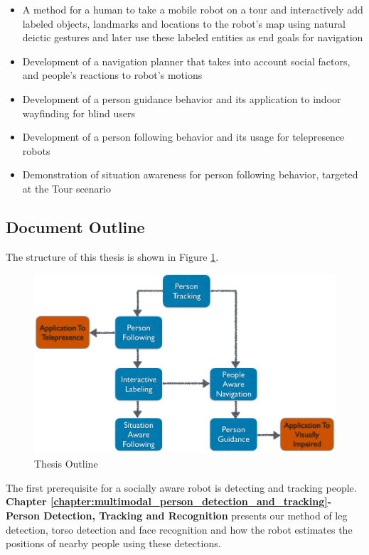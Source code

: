 \begin{itemize}
\item A method for a human to take a mobile robot on a tour and interactively add labeled objects, landmarks and locations to the robot's map using natural deictic gestures and later use these labeled entities as end goals for navigation
\item Development of a navigation planner that takes into account social factors, and people's reactions to robot's motions
\item Development of a person guidance behavior and its application to indoor wayfinding for blind users
\item Development of a person following behavior and its usage for telepresence robots
\item Demonstration of situation awareness for person following behavior, targeted at the Tour scenario
\end{itemize}


\subsection{Document Outline}

The structure of this thesis is shown in Figure \ref{fig:thesis_outline}.

\begin{figure}[ht!]
\centering
\includegraphics[width=1.0\textwidth]{pics/thesis_outline}
\caption{Thesis Outline}
\label{fig:thesis_outline}
\end{figure}

The first prerequisite for a socially aware robot is detecting and tracking people. \textbf{Chapter \ref{chapter:multimodal_person_detection_and_tracking}- Person Detection, Tracking and Recognition} presents our method of leg detection, torso detection and face recognition and how the robot estimates the positions of nearby people using these detections.

